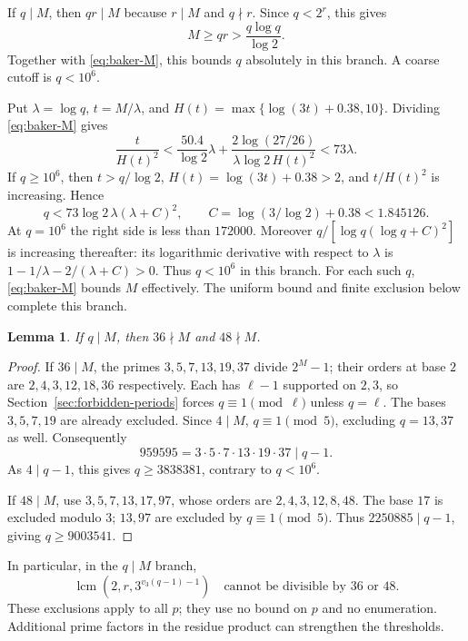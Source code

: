 \documentclass[11pt]{article}
\newtheorem{lemma}{Lemma}
\begin{document}
If $q\mid M$, then $qr\mid M$ because $r\mid M$ and $q\nmid r$.
Since $q<2^r$, this gives
\[
M\geq qr>\frac{q\log q}{\log2}.
\]
Together with \eqref{eq:baker-M}, this bounds $q$ absolutely in this branch.
A coarse cutoff is $q<10^6$.

Put $\lambda=\log q$, $t=M/\lambda$, and
$H(t)=\max\{\log(3t)+0.38,10\}$. Dividing \eqref{eq:baker-M} gives
\[
\frac{t}{H(t)^2}
 <\frac{50.4}{\log2}\lambda
   +\frac{2\log(27/26)}{\lambda\log2\,H(t)^2}
 <73\lambda.
\]
If $q\geq10^6$, then $t>q/\log2$, $H(t)=\log(3t)+0.38>2$,
and $t/H(t)^2$ is increasing. Hence
\[
q<73\log2\,\lambda(\lambda+C)^2,
\qquad C=\log(3/\log2)+0.38<1.845126.
\]
At $q=10^6$ the right side is less than $172000$.
Moreover $q/[\log q(\log q+C)^2]$ is increasing thereafter:
its logarithmic derivative with respect to $\lambda$ is
$1-1/\lambda-2/(\lambda+C)>0$.
Thus $q<10^6$ in this branch. For each such $q$,
\eqref{eq:baker-M} bounds $M$ effectively. The uniform bound and
finite exclusion below complete this branch.

\begin{lemma}
If $q\mid M$, then $36\nmid M$ and $48\nmid M$.
\end{lemma}
\begin{proof}
If $36\mid M$, the primes $3,5,7,13,19,37$ divide $2^M-1$;
their orders at base $2$ are $2,4,3,12,18,36$ respectively.
Each has $\ell-1$ supported on $2,3$, so
Section~\ref{sec:forbidden-periods} forces $q\equiv1\pmod\ell$
unless $q=\ell$. The bases $3,5,7,19$ are already excluded.
Since $4\mid M$, $q\equiv1\pmod5$, excluding $q=13,37$ as well.
Consequently
\[
959595=3\cdot5\cdot7\cdot13\cdot19\cdot37\mid q-1.
\]
As $4\mid q-1$, this gives $q\ge3838381$, contrary to $q<10^6$.

If $48\mid M$, use $3,5,7,13,17,97$, whose orders are
$2,4,3,12,8,48$. The base $17$ is excluded modulo $3$;
$13,97$ are excluded by $q\equiv1\pmod5$.
Thus $2250885\mid q-1$, giving $q\ge9003541$.
\end{proof}
In particular, in the $q\mid M$ branch,
\[
\operatorname{lcm}(2,r,3^{v_3(q-1)-1})
\quad\text{cannot be divisible by }36\text{ or }48.
\]
These exclusions apply to all $p$; they use no bound on $p$ and no
enumeration. Additional prime factors in the residue product can
strengthen the thresholds.
\end{document}
